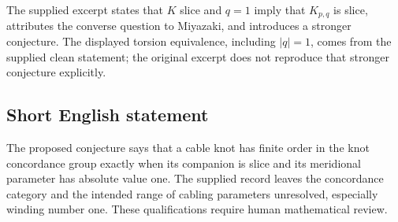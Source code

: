 \documentclass[11pt]{article}
\begin{document}
The supplied excerpt states that $K$ slice and $q=1$ imply that $K_{p,q}$ is slice, attributes the converse question to Miyazaki, and introduces a stronger conjecture. The displayed torsion equivalence, including $|q|=1$, comes from the supplied clean statement; the original excerpt does not reproduce that stronger conjecture explicitly.
\subsection{Short English statement}
The proposed conjecture says that a cable knot has finite order in the knot concordance group exactly when its companion is slice and its meridional parameter has absolute value one. The supplied record leaves the concordance category and the intended range of cabling parameters unresolved, especially winding number one. These qualifications require human mathematical review.
\end{document}

